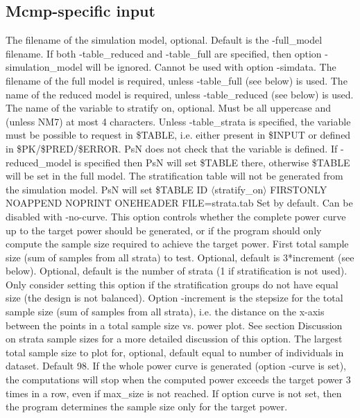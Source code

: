 \subsection{Mcmp-specific input}
\begin{optionlist}
The filename of the simulation model, optional. Default is the -full\_model filename. If both -table\_reduced and -table\_full are specified, then option -simulation\_model will be ignored. Cannot be used with option -simdata. 
\nextopt
{}
The filename of the full model is required, unless -table\_full (see below) is used. 
\nextopt
{}
The name of the reduced model is required, unless -table\_reduced (see below) is used. 
\nextopt
{}
The name of the variable to stratify on, optional. Must be all uppercase and (unless NM7) at most 4 characters. Unless -table\_strata is specified, the variable must be possible to request in \$TABLE, i.e. either present in \$INPUT or defined in \$PK/\$PRED/\$ERROR. PsN does not check that the variable is defined. If -reduced\_model is specified then PsN will set \$TABLE there, otherwise \$TABLE will be set in the full model. The stratification table will not be generated from the simulation model. PsN will set \$TABLE ID $\langle$stratify\_on$\rangle$ FIRSTONLY NOAPPEND NOPRINT ONEHEADER FILE=strata.tab 
\nextopt
{}
Set by default. Can be disabled with -no-curve. This option controls whether the complete power curve up to the target power should be generated, or if the program should only compute the sample size required to achieve the target power. 
\nextopt
{}
First total sample size (sum of samples from all strata) to test. Optional, default is 3*increment (see below). 
\nextopt
{}
Optional, default is the number of strata (1 if stratification is not used). Only consider setting this option if the stratification groups do not have equal size (the design is not balanced). Option -increment is the stepsize for the total sample size (sum of samples from all strata), i.e. the distance on the x-axis between the points in a total sample size vs. power plot. See section Discussion on strata sample sizes for a more detailed discussion of this option. 
\nextopt
{}
The largest total sample size to plot for, optional, default equal to number of individuals in dataset. 
\nextopt
{}
Default 98. If the whole power curve is generated (option -curve is set), the computations will stop when the computed power exceeds the target power 3 times in a row, even if max\_size is not reached. If option curve is not set, then the program determines the sample size only for the target power. 

\end{optionlist}
